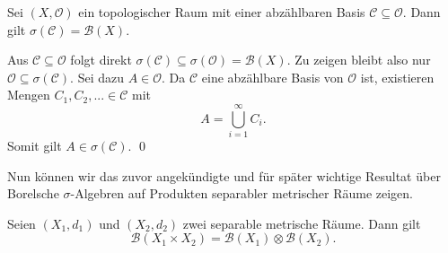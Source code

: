 \begin{lemma}
    Sei $(X, \mathcal{O})$ ein topologischer Raum mit einer abzählbaren Basis $\mathcal{C} \subseteq \mathcal{O}$. Dann gilt $\sigma(\mathcal{C}) = \mathcal{B}(X)$. 
\end{lemma}

\begin{proof*}
    Aus $\mathcal{C} \subseteq \mathcal{O}$ folgt direkt $\sigma(\mathcal{C}) \subseteq \sigma(\mathcal{O}) = \mathcal{B}(X)$. Zu zeigen bleibt also nur $\mathcal{O} \subseteq \sigma(\mathcal{C})$. Sei dazu $A \in \mathcal{O}$. 
    Da $\mathcal{C}$ eine abzählbare Basis von $\mathcal{O}$ ist, existieren Mengen $C_1, C_2,... \in \mathcal{C}$ mit 
    $$
        A = \bigcup_{i=1}^{\infty}C_i.
    $$ 
    Somit gilt $A \in \sigma(\mathcal{C})$. \qed 
\end{proof*}
Nun können wir das zuvor angekündigte und für später wichtige Resultat über Borelsche $\sigma$-Algebren auf Produkten separabler metrischer Räume zeigen. 
\begin{proposition}
    Seien $(X_1, d_1)$ und $(X_2, d_2)$ zwei separable metrische Räume. Dann gilt 
    $$
        \mathcal{B}(X_1 \times X_2) = \mathcal{B}(X_1) \otimes \mathcal{B}(X_2). 
    $$
\end{proposition}

